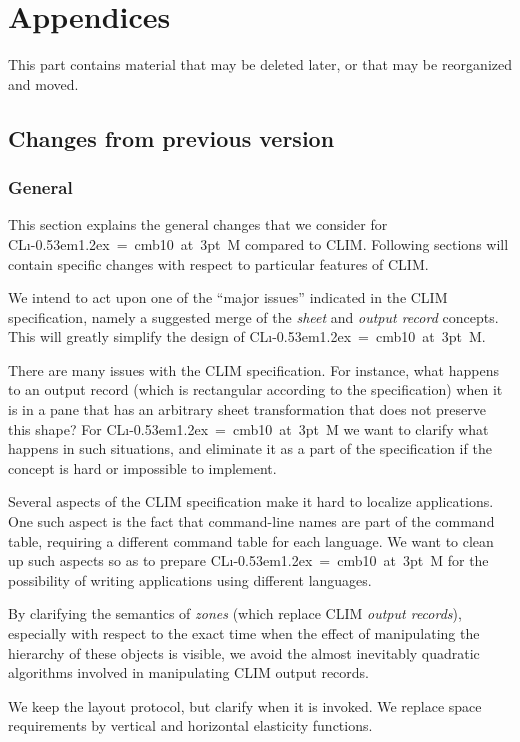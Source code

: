 \documentclass{report}
\def\Tiny{ \font\Tinyfont = cmb10 at 3pt \relax  \Tinyfont}
\def\clim{\textsf{CL{\i}\kern-0.53em\raise1.2ex\hbox{\Tiny 3}M}}
\def\climtwo{CLIM\thinspace{\small II}}
\begin{document}
\part{Appendices}

This part contains material that may be deleted later, or that may be
reorganized and moved.  

\appendix
\chapter{Changes from previous version}

\section{General}

This section explains the general changes that we consider for \clim{}
compared to \climtwo{}.  Following sections will contain specific changes
with respect to particular features of \climtwo{}.

We intend to act upon one of the ``major issues'' indicated in the
\climtwo{} specification, namely a suggested merge of the \emph{sheet} and
\emph{output record} concepts.  This will greatly simplify the design
of \clim{}.

There are many issues with the \climtwo{} specification.  For
instance, what happens to an output record (which is rectangular
according to the specification) when it is in a pane that has an
arbitrary sheet transformation that does not preserve this shape?  For
\clim{} we want to clarify what happens in such situations, and
eliminate it as a part of the specification if the concept is hard or
impossible to implement. 

Several aspects of the \climtwo{} specification make it hard to
localize applications.  One such aspect is the fact that command-line
names are part of the command table, requiring a different command
table for each language.  We want to clean up such aspects so as to
prepare \clim{} for the possibility of writing applications using
different languages. 

By clarifying the semantics of \emph{zones} (which replace \climtwo{}
\emph{output records}), especially with respect to the exact time when
the effect of manipulating the hierarchy of these objects is visible,
we avoid the almost inevitably quadratic algorithms involved in
manipulating \climtwo{} output records. 

We keep the layout protocol, but clarify when it is invoked.  We
replace space requirements by vertical and horizontal elasticity
functions. 
\end{document}
